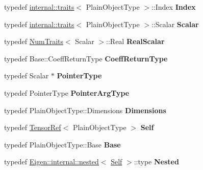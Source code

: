 \begin{DoxyCompactItemize}
typedef \hyperlink{struct_eigen_1_1internal_1_1traits}{internal\+::traits}$<$ Plain\+Object\+Type $>$\+::Index {\bfseries Index}
\item 
\mbox{\label{class_eigen_1_1_tensor_ref_aec8bfa5bff7aff53f179b96f641ec51c}} 
typedef \hyperlink{struct_eigen_1_1internal_1_1traits}{internal\+::traits}$<$ Plain\+Object\+Type $>$\+::Scalar {\bfseries Scalar}
\item 
\mbox{\label{class_eigen_1_1_tensor_ref_a665b2bd916ea866c6a04d614d6c7b742}} 
typedef \hyperlink{group___core___module_struct_eigen_1_1_num_traits}{Num\+Traits}$<$ Scalar $>$\+::Real {\bfseries Real\+Scalar}
\item 
\mbox{\label{class_eigen_1_1_tensor_ref_a65b5979724c422b74e5c4a1dcf02a8bb}} 
typedef Base\+::\+Coeff\+Return\+Type {\bfseries Coeff\+Return\+Type}
\item 
\mbox{\label{class_eigen_1_1_tensor_ref_affcdf4bec56026902f2e62d04ea7015d}} 
typedef Scalar $\ast$ {\bfseries Pointer\+Type}
\item 
\mbox{\label{class_eigen_1_1_tensor_ref_aa2ac960f39391d4e59fe58074d7302ee}} 
typedef Pointer\+Type {\bfseries Pointer\+Arg\+Type}
\item 
\mbox{\label{class_eigen_1_1_tensor_ref_a1f879eb1cae08e336692be625ccc0c4e}} 
typedef Plain\+Object\+Type\+::\+Dimensions {\bfseries Dimensions}
\item 
\mbox{\label{class_eigen_1_1_tensor_ref_ab05281a7d56a24f4a88114d67b64ad1a}} 
typedef \hyperlink{class_eigen_1_1_tensor_ref}{Tensor\+Ref}$<$ Plain\+Object\+Type $>$ {\bfseries Self}
\item 
\mbox{\label{class_eigen_1_1_tensor_ref_a96d89ad1da9d1af09fa63b1e03970655}} 
typedef Plain\+Object\+Type\+::\+Base {\bfseries Base}
\item 
\mbox{\label{class_eigen_1_1_tensor_ref_ab80332ca8505a10fd21fb585f3bbe8e4}} 
typedef \hyperlink{struct_eigen_1_1internal_1_1nested}{Eigen\+::internal\+::nested}$<$ \hyperlink{class_eigen_1_1_tensor_ref}{Self} $>$\+::type {\bfseries Nested}

\end{DoxyCompactItemize}
